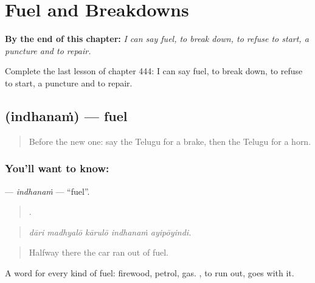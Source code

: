 
\chapter{Fuel and Breakdowns}
\label{ch:te-fuel-and-breakdowns}

\begin{chapteropening}
\textbf{By the end of this chapter:} \emph{I can say fuel, to break down, to refuse to start, a puncture and to repair.}

Complete the last lesson of chapter 444: I can say fuel, to break down, to refuse to start, a puncture and to repair.
\end{chapteropening}

\section[\texorpdfstring{\te{ఇంధనం} (indhanaṁ)}{ఇంధనం (indhanaṁ)}]{ (indhanaṁ) — fuel}

\label{lesson:TE-C444-indhanam}



\begin{quote}
Before the new one: say the Telugu for a brake, then the Telugu for a horn.
\end{quote}

\subsection*{You'll want to know: }
\textbf{} — \emph{indhanaṁ} — \textquotedblleft{}fuel\textquotedblright{}.

\begin{quote}
    .
\end{quote}

\begin{quote}
\emph{dāri madhyalō kārulō indhanaṁ ayipōyindi.}
\end{quote}

\begin{quote}
Halfway there the car ran out of fuel.
\end{quote}

A word for every kind of fuel: firewood, petrol, gas. , to run out, goes with it.

